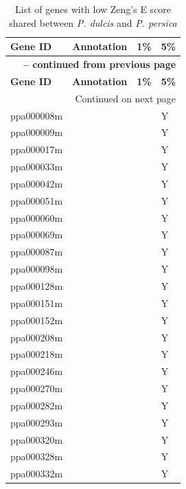 \documentclass[12pt]{article}
\begin{document}
%
\pagebreak
%
\begin{center}
\begin{longtable}{llll}
\caption{List of genes with low Zeng's E score shared between \emph{P. dulcis} and \emph{P. persica}} \label{sampledetails} \\
\hline \hline
\multicolumn{1}{l}{\textbf{Gene ID}} &
\multicolumn{1}{l}{\textbf{Annotation}} &
\multicolumn{1}{l}{\textbf{1\%}} &
\multicolumn{1}{l}{\textbf{5\%}}\\
\hline 
\endfirsthead

\multicolumn{4}{r}{{\bfseries \tablename\ \thetable{} -- continued from previous page}} \\
\hline 
\multicolumn{1}{l}{\textbf{Gene ID}} &
\multicolumn{1}{l}{\textbf{Annotation}} &
\multicolumn{1}{l}{\textbf{1\%}} &
\multicolumn{1}{l}{\textbf{5\%}} \\ \hline 
\endhead
%
\hline \multicolumn{4}{r}{{Continued on next page}} \\ \hline \hline
\endfoot
\hline \hline
\endlastfoot
	ppa000008m & & &Y \\
	ppa000009m & & &Y \\
	ppa000017m & & &Y \\
	ppa000033m & & &Y \\
	ppa000042m & & &Y \\
	ppa000051m & & &Y \\
	ppa000060m & & &Y \\
	ppa000069m & & &Y \\
	ppa000087m & & &Y \\
	ppa000098m & & &Y \\
	ppa000128m & & &Y \\
	ppa000151m & & &Y \\
	ppa000152m & & &Y \\
	ppa000208m & & &Y \\
	ppa000218m & & &Y \\
	ppa000246m & & &Y \\
	ppa000270m & & &Y \\
	ppa000282m & & &Y \\
	ppa000293m & & &Y \\
	ppa000320m & & &Y \\
	ppa000328m & & &Y \\
	ppa000332m & & &Y \\

\end{longtable}
\end{center}
\end{document}
